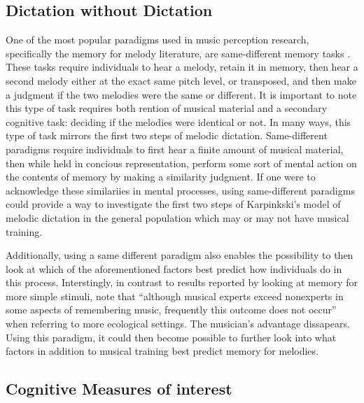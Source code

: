 \documentclass[]{book}
\begin{document}
\hypertarget{dictation-without-dictation}{%
\subsection{Dictation without Dictation}\label{dictation-without-dictation}}

One of the most popular paradigms used in music perception research, specifically the memory for melody literature, are same-different memory tasks \citep{halpernMemoryMelodies2010}.
These tasks require individuals to hear a melody, retain it in memory, then hear a second melody either at the exact same pitch level, or transposed, and then make a judgment if the two melodies were the same or different.
It is important to note this type of task requires both rention of musical material and a secondary cognitive task: deciding if the melodies were identical or not.
In many ways, this type of task mirrors the first two steps of melodic dictation.
Same-different paradigms require individuals to first hear a finite amount of musical material, then while held in concious representation, perform some sort of mental action on the contents of memory by making a similarity judgment.
If one were to acknowledge these similariies in mental processes, using same-different paradigms could provide a way to investigate the first two steps of Karpinkski's model of melodic dictation in the general population which may or may not have musical training.

Additionally, using a same different paradigm also enables the possibility to then look at which of the aforementioned factors best predict how individuals do in this process.
Interstingly, in contrast to results reported by \citep{talaminiMusiciansHaveBetter2017} looking at memory for more simple stimuli, \citep{halpernMemoryMelodies2010} note that ``although musical experts exceed nonexperts in some aspects of remembering music, frequently this outcome does not occur'' when referring to more ecological settings.
The musician's advantage dissapears.
Using this paradigm, it could then become possible to further look into what factors in addition to musical training best predict memory for melodies.

\hypertarget{cognitive-measures-of-interest}{%
\subsection{Cognitive Measures of interest}\label{cognitive-measures-of-interest}}
\end{document}
